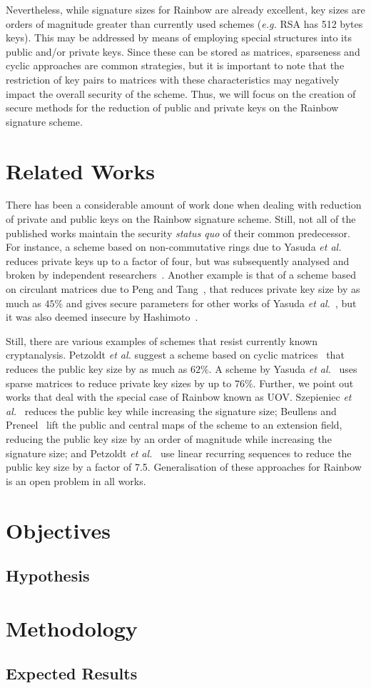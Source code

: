 \documentclass[10pt]{article}
\begin{document}
Nevertheless, while signature sizes for Rainbow are already excellent, key sizes are orders of magnitude greater than currently used schemes (\emph{e.g.} RSA has 512 bytes keys). This may be addressed by means of employing special structures into its public and/or private keys. Since these can be stored as matrices, sparseness and cyclic approaches are common strategies, but it is important to note that the restriction of key pairs to matrices with these characteristics may negatively impact the overall security of the scheme. Thus, we will focus on the creation of secure methods for the reduction of public and private keys on the Rainbow signature scheme.

\section{Related Works}

There has been a considerable amount of work done when dealing with reduction of private and public keys on the Rainbow signature scheme. Still, not all of the published works maintain the security \emph{status quo} of their common predecessor. For instance, a scheme based on non-commutative rings due to Yasuda \emph{et al.}~\cite{Yasu} reduces private keys up to a factor of four, but was subsequently analysed and broken by independent researchers~\cite{}. Another example is that of a scheme based on circulant matrices due to Peng and Tang~\cite{}, that reduces private key size by as much as $45\%$ and gives secure parameters for other works of Yasuda \emph{et al.}~\cite{}, but it was also deemed insecure by Hashimoto~\cite{}. 

Still, there are various examples of schemes that resist currently known cryptanalysis. Petzoldt \emph{et al.} suggest a scheme based on cyclic matrices~\cite{} that reduces the public key size by as much as $62\%$. A scheme by Yasuda \emph{et al.}~\cite{} uses sparse matrices to reduce private key sizes by up to $76\%$. Further, we point out works that deal with the special case of Rainbow known as UOV. Szepieniec \emph{et al.}~\cite{} reduces the public key while increasing the signature size; Beullens and Preneel~\cite{} lift the public and central maps of the scheme to an extension field, reducing the public key size by an order of magnitude while increasing the signature size; and Petzoldt \emph{et al.}~\cite{} use linear recurring sequences to reduce the public key size by a factor of 7.5. Generalisation of these approaches for Rainbow is an open problem in all works.

\section{Objectives}

\subsection{Hypothesis}

\section{Methodology}

\subsection{Expected Results}



\end{document}
